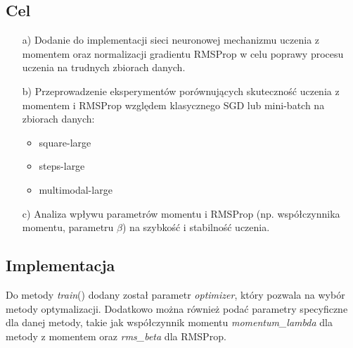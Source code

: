 \documentclass{article}
\begin{document}
\subsection*{Cel}
\begin{enumerate}
    \item[a)] Dodanie do implementacji sieci neuronowej mechanizmu uczenia z momentem oraz normalizacji gradientu RMSProp w celu poprawy procesu uczenia na trudnych zbiorach danych.
    \item[b)] Przeprowadzenie eksperymentów porównujących skuteczność uczenia z momentem i RMSProp względem klasycznego SGD lub mini-batch na zbiorach danych:
    \begin{itemize}
        \item square-large
        \item steps-large
        \item multimodal-large
    \end{itemize}
    \item[c)] Analiza wpływu parametrów momentu i RMSProp (np. współczynnika momentu, parametru $\beta$) na szybkość i stabilność uczenia.
\end{enumerate}

\subsection*{Implementacja}
Do metody \textit{train}() dodany został parametr \textit{optimizer}, który pozwala na wybór metody optymalizacji. Dodatkowo można również podać parametry specyficzne dla danej metody, takie jak współczynnik momentu \textit{momentum\_lambda} dla metody z momentem oraz \textit{rms\_beta} dla RMSProp.
\end{document}
